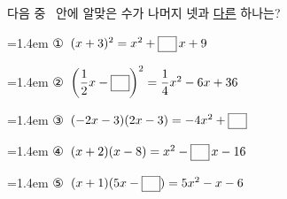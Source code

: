 다음 중 \blank\ 안에 알맞은 수가 나머지 넷과 \underline{다른} 하나는?
\par\medskip\par\noindent\hangindent=1.4em {\small ①}\ $(x+3)^2=x^2+\blank\mkern3mu x+9$\par\noindent\hangindent=1.4em {\small ②}\ $\left(\dfrac{1}{2}x-\blank\right)^2=\dfrac{1}{4}x^2-6x+36$\par\noindent\hangindent=1.4em {\small ③}\ $(-2x-3)(2x-3)=-4x^2+\blank$\par\noindent\hangindent=1.4em {\small ④}\ $(x+2)(x-8)=x^2-\blank\mkern3mu x-16$\par\noindent\hangindent=1.4em {\small ⑤}\ $(x+1)(5x-\blank)=5x^2-x-6$\par\medskip
